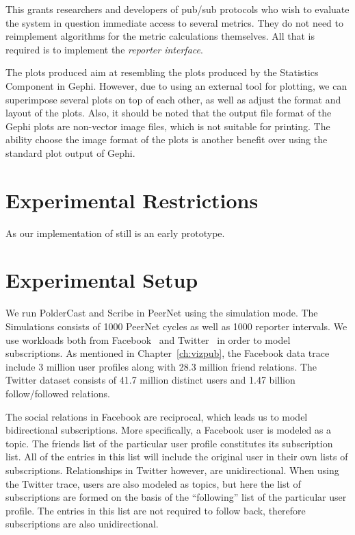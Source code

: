 This grants researchers and developers of pub/sub protocols who wish to evaluate
the system in question immediate access to several metrics. They do not need to
reimplement algorithms for the metric calculations themselves. All that is
required is to implement the \emph{reporter interface}.

The plots produced aim at resembling the plots produced by the
Statistics Component in Gephi. However, due to using an external tool
for plotting, we can superimpose several plots on top of each other, as
well as adjust the format and layout of the plots. Also, it should be
noted that the output file format of the Gephi plots are non-vector
image files, which is not suitable for printing. The ability choose the
image format of the plots is another benefit over using the
standard plot output of Gephi.

\section{Experimental Restrictions}

As our implementation of \demo{} still is an early prototype.

\section{Experimental Setup}

We run PolderCast and Scribe in PeerNet using the simulation mode. The
Simulations consists of 1000 PeerNet cycles as well as 1000 reporter
intervals. We use workloads both from Facebook~\cite{} and
Twitter~\cite{} in order to model subscriptions. As mentioned in
Chapter~\ref{ch:vizpub}, the Facebook data trace include 3 million user
profiles along with 28.3 million friend relations. The Twitter dataset
consists of 41.7 million distinct users and 1.47 billion
follow/followed relations.

The social relations in Facebook are reciprocal, which leads us to model
bidirectional subscriptions. More specifically, a Facebook user is
modeled as a topic. The friends list of the particular user profile
constitutes its subscription list. All of the entries in this list will
include the original user in their own lists of subscriptions.
Relationships in Twitter however, are unidirectional. When using the
Twitter trace, users are also modeled as topics, but here the list of
subscriptions are formed on the basis of the ``following'' list of the
particular  user profile. The entries in this list are not required to
follow back, therefore subscriptions are also unidirectional.

